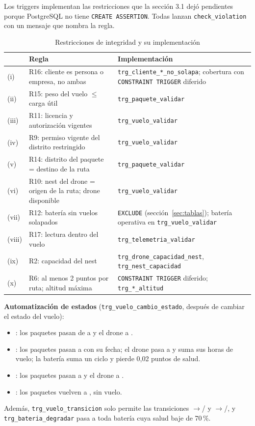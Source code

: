 Los triggers implementan las restricciones que la sección 3.1 dejó pendientes porque PostgreSQL no tiene \texttt{CREATE ASSERTION}. Todas lanzan \texttt{check\_violation} con un mensaje que nombra la regla.

\begin{table}[H]
\centering\small
\caption{Restricciones de integridad y su implementación}
\label{tab:triggers}
\begin{tabular}{lp{6.3cm}p{5.3cm}}
\toprule
& Regla & Implementación \\
\midrule
(i) & R16: cliente es persona o empresa, no ambas & \texttt{trg\_cliente\_*\_no\_solapa}; cobertura con \texttt{CONSTRAINT TRIGGER} diferido \\
(ii) & R15: peso del vuelo $\leq$ carga útil & \texttt{trg\_paquete\_validar} \\
(iii) & R11: licencia y autorización vigentes & \texttt{trg\_vuelo\_validar} \\
(iv) & R9: permiso vigente del distrito restringido & \texttt{trg\_vuelo\_validar} \\
(v) & R14: distrito del paquete = destino de la ruta & \texttt{trg\_paquete\_validar} \\
(vi) & R10: nest del drone = origen de la ruta; drone disponible & \texttt{trg\_vuelo\_validar} \\
(vii) & R12: batería sin vuelos solapados & \texttt{EXCLUDE} (sección~\ref{sec:tablas}); batería operativa en \texttt{trg\_vuelo\_validar} \\
(viii) & R17: lectura dentro del vuelo & \texttt{trg\_telemetria\_validar} \\
(ix) & R2: capacidad del nest & \texttt{trg\_drone\_capacidad\_nest}, \texttt{trg\_nest\_capacidad} \\
(x) & R6: al menos 2 puntos por ruta; altitud máxima & \texttt{CONSTRAINT TRIGGER} diferido; \texttt{trg\_*\_altitud} \\
\bottomrule
\end{tabular}
\end{table}

\textbf{Automatización de estados} (\texttt{trg\_vuelo\_cambio\_estado}, después de cambiar el estado del vuelo):
\begin{itemize}
\item {}: los paquetes pasan de  a  y el drone a .
\item {}: los paquetes pasan a  con su fecha; el drone pasa a  y suma sus horas de vuelo; la batería suma un ciclo y pierde 0,02 puntos de salud.
\item {}: los paquetes pasan a  y el drone a .
\item {}: los paquetes vuelven a , sin vuelo.
\end{itemize}
Además, \texttt{trg\_vuelo\_transicion} solo permite las transiciones $\rightarrow$/ y $\rightarrow$/, y \texttt{trg\_bateria\_degradar} pasa a  toda batería cuya salud baje de 70\,\%.

